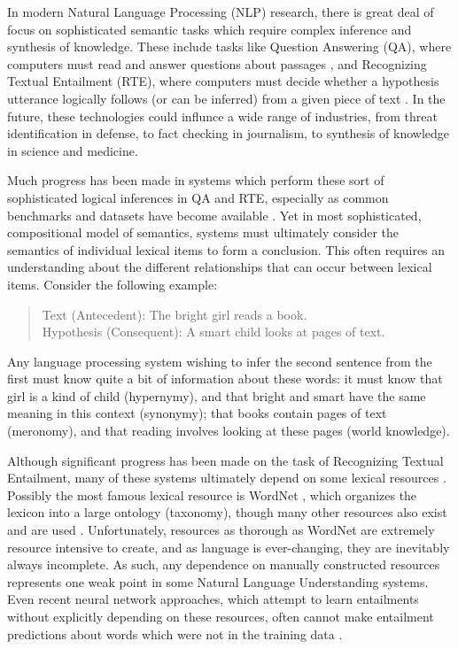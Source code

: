 \documentclass[12pt]{article}
\begin{document}
In modern Natural Language Processing (NLP) research, there is great deal of
focus on sophisticated semantic tasks which require complex inference and
synthesis of knowledge. These include tasks like Question Answering (QA), where
computers must read and answer questions about passages
\cite{hermann:2015:nips,weston:2016:iclr}, and Recognizing Textual Entailment
(RTE), where computers must decide whether a hypothesis utterance logically
follows (or can be inferred) from a given piece of text
\cite{dagan:2006:mlc,marelli:2014:semeval,bowman:2015:emnlp}. In the future,
these technologies could influnce a wide range of industries, from threat
identification in defense, to fact checking in journalism, to
synthesis of knowledge in science and medicine.

Much progress has been made in systems which perform these sort of
sophisticated logical inferences in QA and RTE, especially as common benchmarks
and datasets have become available
\cite{dagan:2006:mlc,giampiccolo:2007:pascal,bentivogli:2009:tac,marelli:2014:semeval,bowman:2015:emnlp}.
Yet in most sophisticated, compositional model of semantics, systems must
ultimately consider the semantics of individual lexical items to form a
conclusion. This often requires an understanding about the different
relationships that can occur between lexical items. Consider the following
example:
\begin{quote}
  Text (Antecedent): The bright girl reads a book.\\
  Hypothesis (Consequent): A smart child looks at pages of text.
\end{quote}
Any language processing system wishing to infer the second sentence from the
first must know quite a bit of information about these words: it must know that
girl is a kind of child (hypernymy), and that bright and smart have the same
meaning in this context (synonymy); that books contain pages of text
(meronomy), and that reading involves looking at these pages (world knowledge).

Although significant progress has been made on the task of Recognizing Textual
Entailment, many of these systems ultimately depend on some lexical resources
\cite{beltagy:2014:semeval,bjerva:2014:semeval,lai:2014:semeval,marelli:2014:semeval,beltagy:2016:cl}.
Possibly the most famous lexical resource is WordNet \cite{miller:1995:acm},
which organizes the lexicon into a large ontology (taxonomy),
though many other resources also exist and are used
\cite{baker:1998:acl,baroni:2011:gems,baroni:2012:eacl,ganitkevitch:2013:naacl,jurgens:2012:semeval,levy:2014:conll,turney:2015:nle}.
Unfortunately, resources as thorough as WordNet are extremely resource
intensive to create, and as language is ever-changing, they are inevitably
always incomplete. As such, any dependence on manually constructed resources
represents one weak point in some Natural Language Understanding systems. Even
recent neural network approaches, which attempt to learn entailments without
explicitly depending on these resources, often cannot make entailment
predictions about words which were not in the training data
\cite{bowman:2015:emnlp,cheng:2016:arxiv}.
\end{document}

